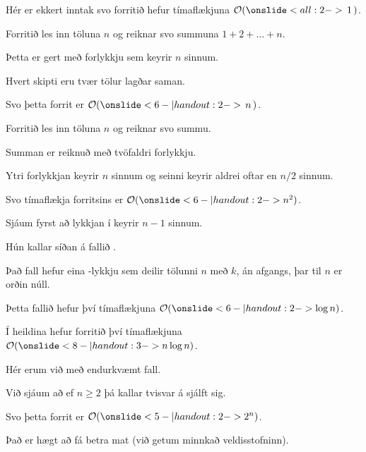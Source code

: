 {
	{
		\item<2-> Hér er ekkert inntak svo forritið hefur tímaflækjuna $\mathcal{O}(\onslide<all:2->{\,1\,})$.
	}
}

{
	{
		\item<2-> Forritið les inn töluna $n$ og reiknar svo summuna $1 + 2 + \dots + n$.
		\item<3-> Þetta er gert með forlykkju sem keyrir $n$ sinnum.
		\item<4-> Hvert skipti eru tvær tölur lagðar saman.
		\item<5-> Svo þetta forrit er $\mathcal{O}(\onslide<6- | handout:2->{\,n\,})$.
	}
}

{
	{
		\item<2-> Forritið les inn töluna $n$ og reiknar svo summu.
		\item<3-> Summan er reiknuð með tvöfaldri forlykkju.
		\item<4-> Ytri forlykkjan keyrir $n$ sinnum og seinni keyrir aldrei oftar en $n/2$ sinnum.
		\item<5-> Svo tímaflækja forritsins er $\mathcal{O}(\onslide<6- | handout:2->{n^2})$.
	}
}

{
	{
		\item<2-> Sjáum fyrst að lykkjan í  keyrir $n - 1$ sinnum.
		\item<3-> Hún kallar síðan á fallið .
		\item<4-> Það fall hefur eina -lykkju sem deilir tölunni $n$ með $k$, án afgangs, þar til $n$ er orðin núll.
		\item<5-> Þetta fallið  hefur því tímaflækjuna $\mathcal{O}(\onslide<6- | handout:2->{\log n})$.
		\item<7-> Í heildina hefur forritið því tímaflækjuna $\mathcal{O}(\onslide<8- | handout:3->{n \log n})$.
	}
}

{
	{
		\item<2-> Hér erum við með endurkvæmt fall.
		\item<3-> Við sjáum að ef $n \geq 2$ þá kallar  tvisvar á sjálft sig.
		\item<4-> Svo þetta forrit er $\mathcal{O}(\onslide<5- | handout:2->{2^n})$.
		\item<6-> Það er hægt að fá betra mat (við getum minnkað veldisstofninn).
	}
}


